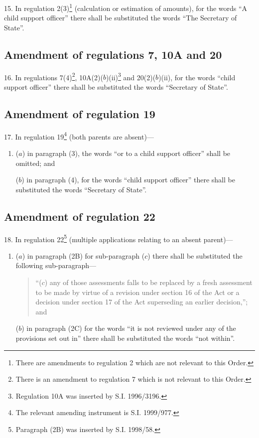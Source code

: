 \documentclass[12pt,a4paper]{article}
\begin{document}
15.  In regulation 2(3)\footnote{\frenchspacing There are amendments to regulation 2 which are not relevant to this Order.} (calculation or estimation of amounts), for the words “A child support officer” there shall be substituted the words “The Secretary of State”.

\subsection[16. Amendment of regulations 7, 10A and 20]{Amendment of regulations 7, 10A and 20}

16.  In regulations 7(4)\footnote{\frenchspacing There is an amendment to regulation 7 which is not relevant to this Order.}, 10A(2)($b$)(ii)\footnote{\frenchspacing Regulation 10A was inserted by S.I. 1996/3196.} and 20(2)($b$)(ii), for the words “child support officer” there shall be substituted the words “Secretary of State”.

\subsection[17. Amendment of regulation 19]{Amendment of regulation 19}

17.  In regulation 19\footnote{\frenchspacing The relevant amending instrument is S.I. 1999/977.} (both parents are absent)—
\begin{enumerate}\item[]
($a$) in paragraph (3), the words “or to a child support officer” shall be omitted; and

($b$) in paragraph (4), for the words “child support officer” there shall be substituted the words “Secretary of State”.
\end{enumerate}

\subsection[18. Amendment of regulation 22]{Amendment of regulation 22}

18.  In regulation 22\footnote{\frenchspacing Paragraph (2B) was inserted by S.I. 1998/58.} (multiple applications relating to an absent parent)—
\begin{enumerate}\item[]
($a$) in paragraph (2B) for sub-paragraph ($c$) there shall be substituted the following sub-paragraph—
\begin{quotation}
“($c$) any of those assessments falls to be replaced by a fresh assessment to be made by virtue of a revision under section 16 of the Act or a decision under section 17 of the Act superseding an earlier decision,”; and
\end{quotation}

($b$) in paragraph (2C) for the words “it is not reviewed under any of the provisions set out in” there shall be substituted the words “not within”.
\end{enumerate}
\end{document}
